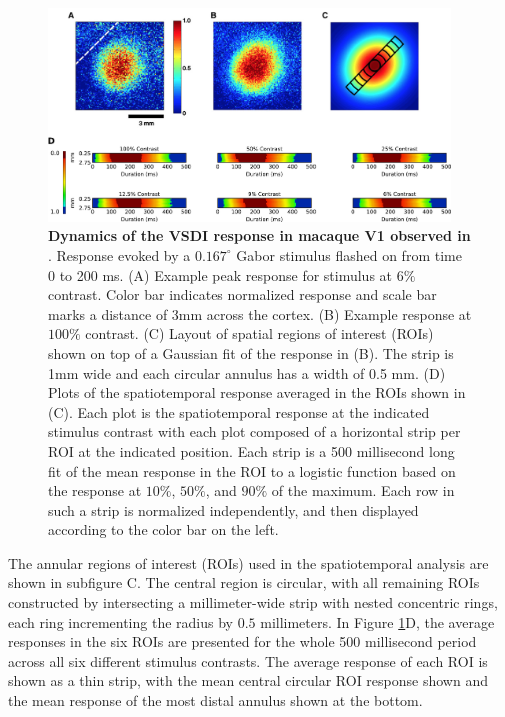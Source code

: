 \documentclass[phd,ianc,twoside]{infthesis}
\begin{document}
\begin{figure}
\center
\includegraphics[width=0.95\textwidth]{./figures/sit_data.pdf}
\caption{{\bf Dynamics of the VSDI response in macaque V1 observed in
    \citet{sit_neuron09}}. Response evoked by a $0.167^\circ$ Gabor
  stimulus flashed on from time 0 to 200 ms. (A) Example peak response
  for stimulus at $6\%$ contrast. Color bar indicates normalized
  response and scale bar marks a distance of 3mm across the cortex. (B)
  Example response at $100\%$ contrast. (C) Layout of spatial regions of
  interest (ROIs) shown on top of a Gaussian fit of the response in
  (B). The strip is 1mm wide and each circular annulus has a width of
  0.5 mm. (D) Plots of the spatiotemporal response averaged in the ROIs
  shown in (C). Each plot is the spatiotemporal response at the
  indicated stimulus contrast with each plot composed of a horizontal
  strip per ROI at the indicated position. Each strip is a 500
  millisecond long fit of the mean response in the ROI to a logistic
  function based on the response at $10\%$, $50\%$, and $90\%$ of the
  maximum. Each row in such a strip is normalized independently,
  and then displayed according to the color bar on the left.}
  \label{fig:sit_data}
\end{figure}

The annular regions of interest (ROIs) used in the spatiotemporal
analysis are shown in subfigure C. The central region is circular, with
all remaining ROIs constructed by intersecting a millimeter-wide strip
with nested concentric rings, each ring incrementing the radius by $0.5$
millimeters. In Figure \ref{fig:sit_data}D, the average responses in the
six ROIs are presented for the whole 500 millisecond period across all
six different stimulus contrasts. The average response of each ROI is
shown as a thin strip, with the mean central circular ROI response shown
and the mean response of the most distal annulus shown at the bottom.
\end{document}
